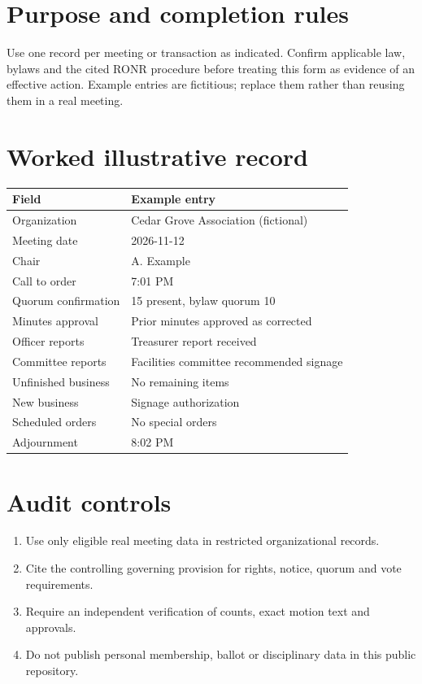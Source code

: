 \documentclass[11pt]{article}
\begin{document}
\SuiteOpen
\section{Purpose and completion rules}
Use one record per meeting or transaction as indicated. Confirm applicable law, bylaws and the cited RONR procedure before treating this form as evidence of an effective action. Example entries are fictitious; replace them rather than reusing them in a real meeting.

\section{Worked illustrative record}
\begin{longtable}{@{}p{.38\linewidth}p{.55\linewidth}@{}}\toprule Field & Example entry\\\midrule\endhead


Organization & Cedar Grove Association (fictional)\\
Meeting date & 2026-11-12\\
Chair & A. Example\\
Call to order & 7:01 PM\\
Quorum confirmation & 15 present, bylaw quorum 10\\
Minutes approval & Prior minutes approved as corrected\\
Officer reports & Treasurer report received\\
Committee reports & Facilities committee recommended signage\\
Unfinished business & No remaining items\\
New business & Signage authorization\\
Scheduled orders & No special orders\\
Adjournment & 8:02 PM\\
\bottomrule\end{longtable}
\section{Audit controls}
\begin{enumerate}[leftmargin=*,itemsep=4pt]
\item Use only eligible real meeting data in restricted organizational records.
\item Cite the controlling governing provision for rights, notice, quorum and vote requirements.
\item Require an independent verification of counts, exact motion text and approvals.
\item Do not publish personal membership, ballot or disciplinary data in this public repository.
\end{enumerate}
\end{document}
